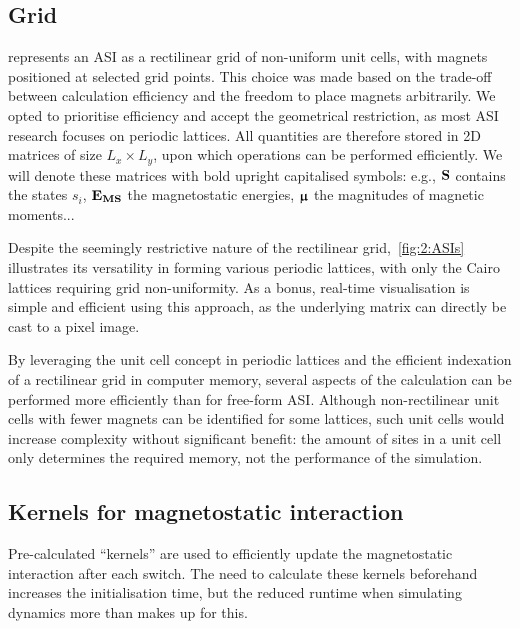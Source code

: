 \subsection{Grid}
\hotspice{} represents an ASI as a rectilinear grid of non-uniform unit cells, with magnets positioned at selected grid points.
This choice was made based on the trade-off between calculation efficiency and the freedom to place magnets arbitrarily.
We opted to prioritise efficiency and accept the geometrical restriction, as most ASI research focuses on periodic lattices.
All quantities are therefore stored in 2D matrices of size $L_x \times L_y$, upon which operations can be performed efficiently.
We will denote these matrices with bold upright capitalised symbols: e.g., $\boldsymbol{\mathbf{S}}$ contains the states $s_i$, $\boldsymbol{\mathbf{E_\mathrm{MS}}}$ the magnetostatic energies, $\boldsymbol{\mathbf{\upmu}}$ the magnitudes of magnetic moments... \par %
Despite the seemingly restrictive nature of the rectilinear grid,~\cref{fig:2:ASIs} illustrates its versatility in forming various periodic lattices, with only the Cairo lattices requiring grid non-uniformity.
As a bonus, real-time visualisation is simple and efficient using this approach, as the underlying matrix can directly be cast to a pixel image. \par
By leveraging the unit cell concept in periodic lattices and the efficient indexation of a rectilinear grid in computer memory, several aspects of the calculation can be performed more efficiently than for free-form ASI.
Although non-rectilinear unit cells with fewer magnets can be identified for some lattices, such unit cells would increase complexity without significant benefit: the amount of sites in a unit cell only determines the required memory, not the performance of the simulation.

\subsection{Kernels for magnetostatic interaction}\label{sec:2:Kernels}
Pre-calculated ``kernels'' are used to efficiently update the magnetostatic interaction after each switch. 
The need to calculate these kernels beforehand increases the initialisation time, but the reduced runtime when simulating dynamics more than makes up for this.

